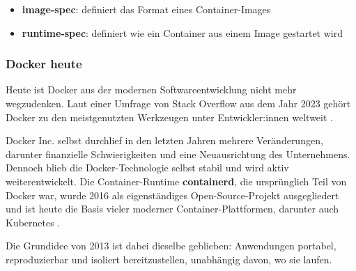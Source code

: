\begin{itemize}
    \item \textbf{image-spec}: definiert das Format eines 
    Container-Images
    \item \textbf{runtime-spec}: definiert wie ein Container aus 
    einem Image gestartet wird
\end{itemize}

\subsubsection{Docker heute}

Heute ist Docker aus der modernen Softwareentwicklung nicht mehr 
wegzudenken. Laut einer Umfrage von Stack Overflow aus dem Jahr 2023 
gehört Docker zu den meistgenutzten Werkzeugen unter Entwickler:innen 
weltweit \cite{ionos_docker}.

Docker Inc. selbst durchlief in den letzten Jahren mehrere 
Veränderungen, darunter finanzielle Schwierigkeiten und eine 
Neuausrichtung des Unternehmens. Dennoch blieb die Docker-Technologie 
selbst stabil und wird aktiv weiterentwickelt. Die Container-Runtime 
\textbf{containerd}, die ursprünglich Teil von Docker war, wurde 2016 
als eigenständiges Open-Source-Projekt ausgegliedert und ist heute 
die Basis vieler moderner Container-Plattformen, darunter auch 
Kubernetes \cite{ionos_docker}.

Die Grundidee von 2013 ist dabei dieselbe geblieben: Anwendungen 
portabel, reproduzierbar und isoliert bereitzustellen, unabhängig 
davon, wo sie laufen.